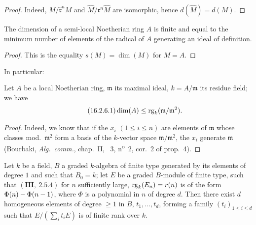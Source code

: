 
\begin{proof}
Indeed, $M/\widehat{\mathfrak{r}}^n M$ and $\widehat{M}/\mathfrak{r}^n\widehat{M}$ are isomorphic, hence $d(\widehat{M})=d(M)$.
\end{proof}

\begin{corollary}[16.2.5]
\label{0.16.2.5}
The dimension of a semi-local Noetherian ring $A$ is finite and equal to the minimum number of elements of the radical of $A$ generating an ideal of definition.
\end{corollary}

\begin{proof}
This is the equality $s(M)=\dim(M)$ for $M=A$.
\end{proof}

In particular:

\begin{corollary}[16.2.6]
\label{0.16.2.6}
Let $A$ be a local Noetherian ring, $\mathfrak{m}$ its maximal ideal, $k=A/\mathfrak{m}$ its residue field; we have
\begin{equation}
\label{0.16.2.6.1}
\tag{16.2.6.1}
  \dim(A)\leq\operatorname{rg}_k(\mathfrak{m}/\mathfrak{m}^2).
\end{equation}
\end{corollary}

\begin{proof}
Indeed, we know that if the $x_i$ $(1\leq i\leq n)$ are elements of $\mathfrak{m}$ whose classes mod.~$\mathfrak{m}^2$ form a basis of the $k$-vector space $\mathfrak{m}/\mathfrak{m}^2$, the $x_i$ generate $\mathfrak{m}$ (Bourbaki, \emph{Alg.~comm.}, chap.~II, \textsection~3, n\textsuperscript{o}~2, cor.~2 of prop.~4).
\end{proof}

\begin{proposition}[16.2.7]
\label{0.16.2.7}
Let $k$ be a field, $B$ a graded $k$-algebra of finite type generated by its elements of degree $1$ and such that $B_0=k$; let $E$ be a graded $B$-module of finite type, such that $(\mathbf{III},~2.5.4)$ for $n$ sufficiently large, $\operatorname{rg}_k(E_n)=r(n)$ is of the form $\Phi(n)-\Phi(n- 1)$, where $\Phi$ is a polynomial in $n$ of degree $d$.
Then there exist $d$ homogeneous elements of degree $\geq 1$ in $B$, $t_1,\ldots,t_d$, forming a family $(t_i)_{1\leq i\leq d}$ such that $E/(\sum_i t_i E)$ is of finite rank over $k$.
\end{proposition}

